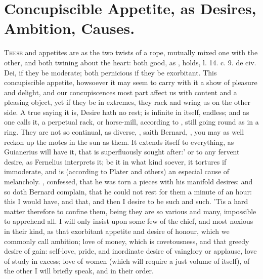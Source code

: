 {%
\section{Concupiscible Appetite, as Desires, Ambition, Causes.}

\lettrine{T}{hese}  and  appetites are as the two twists of a
rope, mutually mixed one with the other, and both twining about the
heart: both good, as \Austin{}, holds, l. 14. c. 9. de civ. Dei, if
they be moderate; both pernicious if they be exorbitant. This
concupiscible appetite, howsoever it may seem to carry with it a show
of pleasure and delight, and our concupiscences most part affect us
with content and a pleasing object, yet if they be in extremes, they
rack and wring us on the other side. A true saying it is, Desire hath
no rest; is infinite in itself, endless; and as one calls it, a
perpetual rack, or horse-mill, according to \Austin{}, still going
round as in a ring. They are not so continual, as diverse, , saith Bernard, , you may as well reckon up the motes in the sun
as them. It extends itself to everything, as Guianerius will have
it, that is superfluously sought after:' or to any fervent
desire, as Fernelius interprets it; be it in what kind soever, it
tortures if immoderate, and is (according to Plater and others)
an especial cause of melancholy. , \Austin{} confessed, that he was torn a pieces
with his manifold desires: and so doth Bernard complain, that he
could not rest for them a minute of an hour: this I would have, and
that, and then I desire to be such and such. 'Tis a hard matter
therefore to confine them, being they are so various and many,
impossible to apprehend all. I will only insist upon some few of the
chief, and most noxious in their kind, as that exorbitant appetite and
desire of honour, which we commonly call ambition; love of money, which
is covetousness, and that greedy desire of gain: self-love, pride, and
inordinate desire of vainglory or applause, love of study in excess;
love of women (which will require a just volume of itself), of the
other I will briefly speak, and in their order.

}
